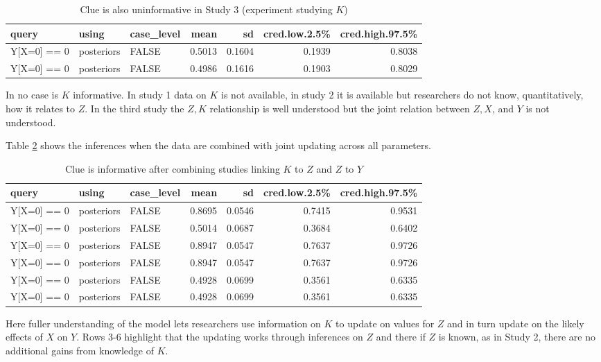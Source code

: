 \documentclass[
  12pt,
]{book}
\begin{document}
\begin{table}

\caption{\label{tab:frank3}Clue is also uninformative in Study 3 (experiment studying $K$)}
\centering
\begin{tabular}[t]{l|l|l|r|r|r|r}
\hline
query & using & case\_level & mean & sd & cred.low.2.5\% & cred.high.97.5\%\\
\hline
Y[X=0] == 0 & posteriors & FALSE & 0.5013 & 0.1604 & 0.1939 & 0.8038\\
\hline
Y[X=0] == 0 & posteriors & FALSE & 0.4986 & 0.1616 & 0.1903 & 0.8029\\
\hline
\end{tabular}
\end{table}

In no case is \(K\) informative. In study 1 data on \(K\) is not available, in study 2 it is available but researchers do not know, quantitatively, how it relates to \(Z\). In the third study the \(Z,K\) relationship is well understood but the joint relation between \(Z,X\), and \(Y\) is not understood.

Table \ref{tab:frank4} shows the inferences when the data are combined with joint updating across all parameters.

\begin{table}

\caption{\label{tab:frank4}Clue is informative after combining studies linking $K$ to $Z$ and $Z$ to $Y$}
\centering
\begin{tabular}[t]{l|l|l|r|r|r|r}
\hline
query & using & case\_level & mean & sd & cred.low.2.5\% & cred.high.97.5\%\\
\hline
Y[X=0] == 0 & posteriors & FALSE & 0.8695 & 0.0546 & 0.7415 & 0.9531\\
\hline
Y[X=0] == 0 & posteriors & FALSE & 0.5014 & 0.0687 & 0.3684 & 0.6402\\
\hline
Y[X=0] == 0 & posteriors & FALSE & 0.8947 & 0.0547 & 0.7637 & 0.9726\\
\hline
Y[X=0] == 0 & posteriors & FALSE & 0.8947 & 0.0547 & 0.7637 & 0.9726\\
\hline
Y[X=0] == 0 & posteriors & FALSE & 0.4928 & 0.0699 & 0.3561 & 0.6335\\
\hline
Y[X=0] == 0 & posteriors & FALSE & 0.4928 & 0.0699 & 0.3561 & 0.6335\\
\hline
\end{tabular}
\end{table}

Here fuller understanding of the model lets researchers use information on \(K\) to update on values for \(Z\) and in turn update on the likely effects of \(X\) on \(Y\). Rows 3-6 highlight that the updating works through inferences on \(Z\) and there if \(Z\) is known, as in Study 2, there are no additional gains from knowledge of \(K\).
\end{document}
